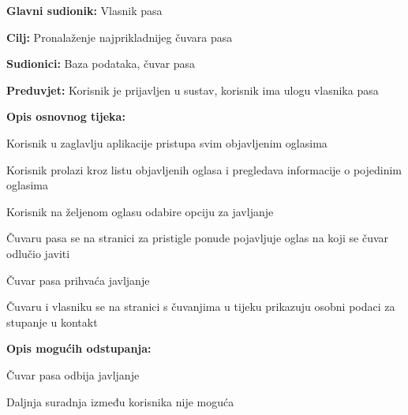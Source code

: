 					\noindent {}
					\begin{packed_item}
						
						\item \textbf{Glavni sudionik: } Vlasnik pasa
						\item  \textbf{Cilj:} Pronalaženje najprikladnijeg čuvara pasa
						\item  \textbf{Sudionici:} Baza podataka, čuvar pasa
						\item  \textbf{Preduvjet:} Korisnik je prijavljen u sustav, korisnik ima ulogu vlasnika pasa
						\item  \textbf{Opis osnovnog tijeka:}
						
						\item[] \begin{packed_enum}
							
							\item Korisnik u zaglavlju aplikacije pristupa svim objavljenim oglasima  
							\item Korisnik prolazi kroz listu objavljenih oglasa i pregledava informacije o pojedinim oglasima
							\item Korisnik na željenom oglasu odabire opciju za javljanje 
							\item Čuvaru pasa se na stranici za pristigle ponude pojavljuje oglas na koji se čuvar odlučio javiti
							\item Čuvar pasa prihvaća javljanje
							\item Čuvaru i vlasniku se na stranici s čuvanjima u tijeku prikazuju osobni podaci za stupanje u kontakt
							
						\end{packed_enum}
						
						\item  \textbf{Opis mogućih odstupanja:}
						
						\item[] \begin{packed_item}
							
							\item[5.a] Čuvar pasa odbija javljanje 
							\item[] \begin{packed_enum}
								
								\item Daljnja suradnja između korisnika nije moguća
								
							\end{packed_enum}
						\end{packed_item}
					\end{packed_item}
				
